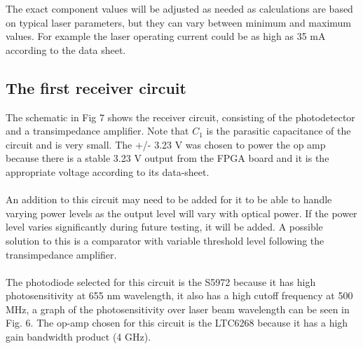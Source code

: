\documentclass[conference]{IEEEtran}
\begin{document}
The exact component values will be adjusted as needed as calculations are based on typical laser parameters, but they can vary between minimum and maximum values. For example the laser operating current could be as high as 35 mA according to the data sheet.

\subsection{The first receiver circuit}

The schematic in Fig 7 shows the receiver circuit, consisting of the photodetector and a transimpedance amplifier. Note that $C_{1}$ is the parasitic capacitance of the circuit and is very small. The +/- 3.23 V was chosen to power the op amp because there is a stable 3.23 V output from the FPGA board and it is the appropriate voltage according to its data-sheet. 
\\\\
An addition to this circuit may need to be added for it to be able to handle varying power levels as the output level will vary with optical power. If the power level varies significantly during future testing, it will be added. A possible solution to this is a comparator with variable threshold level following the transimpedance amplifier.
\\\\
The photodiode selected for this circuit is the S5972 because it has high photosensitivity at 655 nm wavelength, it also has a high cutoff frequency at 500 MHz, a graph of the photosensitivity over laser beam wavelength can be seen in Fig. 6. The op-amp chosen for this circuit is the LTC6268 because it has a high gain bandwidth product (4 GHz). 
\end{document}
